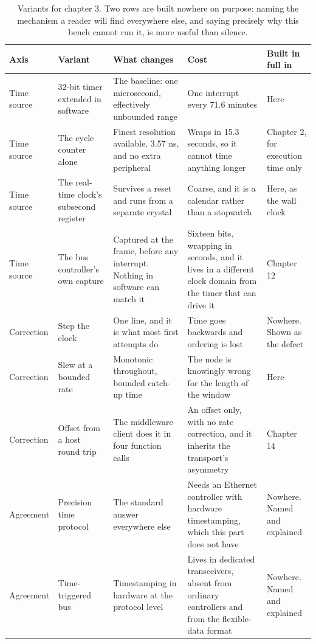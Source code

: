 \begin{table}[H]\centering\small
\begin{tabular}{p{24mm}p{26mm}p{44mm}p{22mm}p{20mm}}
\toprule
Axis & Variant & What changes & Cost & Built in full in \\
\midrule
Time source & 32-bit timer extended in software & The baseline: one microsecond, effectively unbounded range & One interrupt every 71.6 minutes & Here \\
Time source & The cycle counter alone & Finest resolution available, 3.57 ns, and no extra peripheral & Wraps in 15.3 seconds, so it cannot time anything longer & Chapter 2, for execution time only \\
Time source & The real-time clock's subsecond register & Survives a reset and runs from a separate crystal & Coarse, and it is a calendar rather than a stopwatch & Here, as the wall clock \\
Time source & The bus controller's own capture & Captured at the frame, before any interrupt. Nothing in software can match it & Sixteen bits, wrapping in seconds, and it lives in a different clock domain from the timer that can drive it & Chapter 12 \\
Correction & Step the clock & One line, and it is what most first attempts do & Time goes backwards and ordering is lost & Nowhere. Shown as the defect \\
Correction & Slew at a bounded rate & Monotonic throughout, bounded catch-up time & The node is knowingly wrong for the length of the window & Here \\
Correction & Offset from a host round trip & The middleware client does it in four function calls & An offset only, with no rate correction, and it inherits the transport's asymmetry & Chapter 14 \\
Agreement & Precision time protocol & The standard answer everywhere else & Needs an Ethernet controller with hardware timestamping, which this part does not have & Nowhere. Named and explained \\
Agreement & Time-triggered bus & Timestamping in hardware at the protocol level & Lives in dedicated transceivers, absent from ordinary controllers and from the flexible-data format & Nowhere. Named and explained \\
\bottomrule
\end{tabular}
\caption{Variants for chapter 3. Two rows are built nowhere on purpose: naming the mechanism a reader will find everywhere else, and saying precisely why this bench cannot run it, is more useful than silence.}
\end{table}

